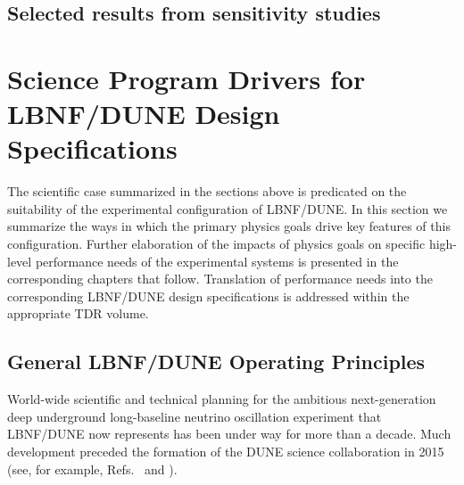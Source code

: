 \subsection{Selected results from sensitivity studies}
\label{sec:exec-sensitiv-results}


\section{Science Program Drivers for LBNF/DUNE Design Specifications}
\label{sec:exec-key-reqs}

The scientific case summarized in the sections above
is predicated on the suitability of the experimental
configuration of LBNF/DUNE.  In this section we summarize
the ways in which the primary physics goals drive key features
of this configuration.  Further elaboration of the impacts of
physics goals on specific high-level performance needs of the
experimental systems is presented in the corresponding chapters
that follow.  Translation of performance needs into the
corresponding LBNF/DUNE design specifications is addressed within
the appropriate TDR volume.

\subsection{General LBNF/DUNE Operating Principles}

World-wide scientific and technical planning for the
ambitious next-generation deep underground long-baseline
neutrino oscillation experiment that LBNF/DUNE now represents
has been under way for more than a decade.  Much
development preceded the formation of the DUNE science
collaboration in 2015 (see, for example,
Refs.~\cite{Adams:2013qkq} and \cite{LAGUNA-LBNO-deliv}).

